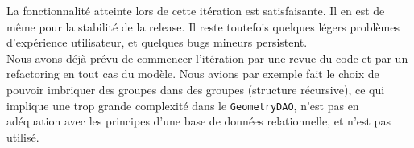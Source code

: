 La fonctionnalité atteinte lors de cette itération est satisfaisante. Il en est
de même pour la stabilité de la release. Il reste toutefois quelques légers
problèmes d'expérience utilisateur, et quelques bugs mineurs persistent.\\

Nous avons déjà prévu de commencer l'itération par une revue du code et
par un refactoring en tout cas du modèle. Nous avions par exemple fait le choix
de pouvoir imbriquer des groupes dans des groupes (structure récursive), ce qui
implique une trop grande complexité dans le \texttt{GeometryDAO}, n'est pas
en adéquation avec les principes d'une base de données relationnelle, et n'est
pas utilisé.
